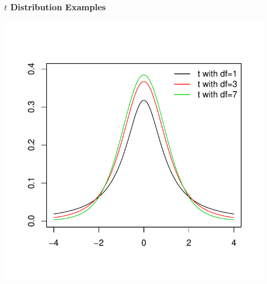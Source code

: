 \documentclass[slides]{beamer}
\begin{document}
\begin{frame}
\frametitle{$t$ Distribution Examples}
\begin{center}
\includegraphics{lec16-003}
\end{center}
\end{frame}
\end{document}
